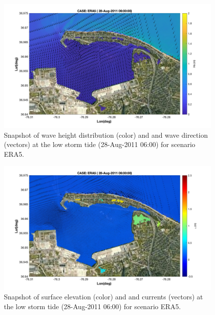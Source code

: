 \documentclass[preprint,12pt,authoryear] {elsarticle}
\begin{document}
\begin{figure}
\centering
\includegraphics[width=\textwidth]{./figures/nearcom_hs_ERA5_133.jpg}
\caption{Snapshot of wave height distribution (color) and and wave direction (vectors) at the low storm tide (28-Aug-2011 06:00) for scenario ERA5. }
\label{ERA5_hs_3}
\centering
\end{figure}

\begin{figure}
\centering
\includegraphics[width=\textwidth]{./figures/nearcom_ele_ERA5_133.jpg}
\caption{Snapshot of surface elevation (color) and and currents (vectors) at the low storm tide (28-Aug-2011 06:00) for scenario ERA5. }
\label{ERA5_eta_3}
\centering
\end{figure}

\end{document}
